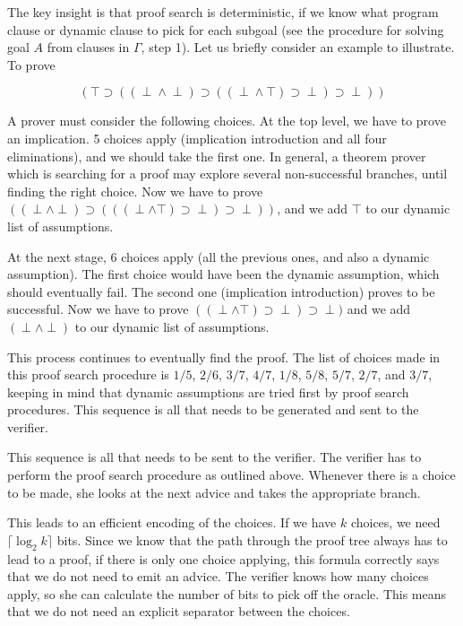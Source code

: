 \documentclass{acmconf}
\begin{document}
The key insight is that proof search is deterministic, if we know what
program clause or dynamic clause to pick for each subgoal (see the
procedure for solving goal $A$ from clauses in $\Gamma$, step 1). Let
us briefly consider an example to illustrate. To prove

\[
(\top\!\supset\!((\perp\!\wedge\!\perp)\!\supset\!%
((\perp\!\wedge\!\top)\!\supset\!\perp)\!\supset\!\perp))
\]

A prover must consider the following choices.
At the top level, we have to prove an implication. 5 choices apply
(implication introduction and all four eliminations), and we should
take the first one. In general, a theorem prover which is searching for a
proof may explore several non-successful branches, until finding the
right choice. Now we have to prove
$((\perp\wedge\perp)\supset(((\perp\wedge\top)\supset\perp)\supset\perp))$,
and we add $\top$ to our dynamic list of assumptions.

At the next stage, 6 choices apply (all the previous ones, and also a
dynamic assumption). The first choice would have
been the dynamic assumption, which should eventually fail.
The second one (implication introduction) proves to be successful. Now we
have to prove $((\perp\wedge\top)\supset\perp)\supset\perp)$ and we add
$(\perp\wedge\perp)$ to our dynamic list of assumptions.

This process continues to eventually find the proof. The list of
choices made in this proof search procedure is $1/5$, $2/6$, $3/7$,
$4/7$, $1/8$, $5/8$, $5/7$, $2/7$, and $3/7$, keeping in mind that
dynamic assumptions are tried first by proof search procedures.      
This sequence is all that needs to be generated and sent to the
verifier. 
      
This sequence is all that needs to be sent to the verifier. The
verifier has to perform the proof search procedure as outlined
above. Whenever there is a choice to be made, she looks at the next
advice and takes the appropriate branch.

This leads to an efficient encoding of the choices. If we have $k$
choices, we need $\lceil\log_2 k\rceil$ bits. Since we know that the
path through the proof tree always has to lead to a proof, if there is
only one choice applying, this formula correctly says that we do not
need to emit an advice.  The verifier knows how many choices apply, so
she can calculate the number of bits to pick off the oracle. This
means that we do not need an explicit separator between the choices.
\end{document}
